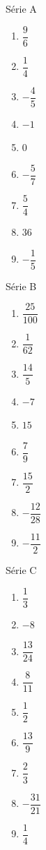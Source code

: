 \documentclass[../math2.tex]{subfiles}
\begin{document}
\begin{solution}
  Série A
  \begin{enumerate}[cols=3]
    \item \(\dfrac{9}{6}\)
    \item \(\dfrac{1}{4}\)
    \item \(-\dfrac{4}{5}\)
    \item \(-1\)
    \item \(0\)
    \item \(-\dfrac{5}{7}\)
    \item \(\dfrac{5}{4}\)
    \item \(36\)
    \item \(-\dfrac{1}{5}\)
  \end{enumerate}

  Série B
  \begin{enumerate}
    \item \(\dfrac{25}{100}\)
    \item \(\dfrac{1}{62}\)
    \item \(\dfrac{14}{5}\)
    \item \(-7\)
    \item \(15\)
    \item \(\dfrac{7}{9}\)
    \item \(\dfrac{15}{2}\)
    \item \(-\dfrac{12}{28}\)
    \item \(-\dfrac{11}{2}\)
  \end{enumerate}

  Série C
  \begin{enumerate}
    \item \(\dfrac{1}{3}\)
    \item \(-8\)
    \item \(\dfrac{13}{24}\)
    \item \(\dfrac{8}{11}\)
    \item \(\dfrac{1}{2}\)
    \item \(\dfrac{13}{9}\)
    \item \(\dfrac{2}{3}\)
    \item \(-\dfrac{31}{21}\)
    \item \(\dfrac{1}{4}\)
  \end{enumerate}
\end{solution}
\end{document}
